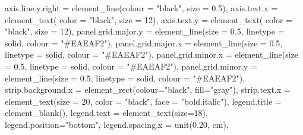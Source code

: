 \documentclass[
]{book}
\newenvironment{Shaded}{\begin{snugshade}}{\end{snugshade}}
\newcommand{\AttributeTok}[1]{\textcolor[rgb]{0.77,0.63,0.00}{#1}}
\newcommand{\DecValTok}[1]{\textcolor[rgb]{0.00,0.00,0.81}{#1}}
\newcommand{\FloatTok}[1]{\textcolor[rgb]{0.00,0.00,0.81}{#1}}
\newcommand{\FunctionTok}[1]{\textcolor[rgb]{0.00,0.00,0.00}{#1}}
\newcommand{\NormalTok}[1]{#1}
\newcommand{\StringTok}[1]{\textcolor[rgb]{0.31,0.60,0.02}{#1}}
\begin{document}
\begin{Shaded}
\begin{Highlighting}[]
  \AttributeTok{axis.line.y.right  =} \FunctionTok{element\_line}\NormalTok{(}\AttributeTok{colour =} \StringTok{"black"}\NormalTok{, }\AttributeTok{size =} \FloatTok{0.5}\NormalTok{),}
  \AttributeTok{axis.text.x        =} \FunctionTok{element\_text}\NormalTok{( }\AttributeTok{color =} \StringTok{"black"}\NormalTok{, }\AttributeTok{size =} \DecValTok{12}\NormalTok{),}
  \AttributeTok{axis.text.y        =} \FunctionTok{element\_text}\NormalTok{( }\AttributeTok{color =} \StringTok{"black"}\NormalTok{, }\AttributeTok{size =} \DecValTok{12}\NormalTok{),}
  \AttributeTok{panel.grid.major.y =} \FunctionTok{element\_line}\NormalTok{(}\AttributeTok{size =} \FloatTok{0.5}\NormalTok{,}
                                    \AttributeTok{linetype =} \StringTok{\textquotesingle{}solid\textquotesingle{}}\NormalTok{, }\AttributeTok{colour =} \StringTok{"\#EAEAF2"}\NormalTok{),}
  \AttributeTok{panel.grid.major.x =} \FunctionTok{element\_line}\NormalTok{(}\AttributeTok{size =} \FloatTok{0.5}\NormalTok{,}
                                    \AttributeTok{linetype =} \StringTok{\textquotesingle{}solid\textquotesingle{}}\NormalTok{, }\AttributeTok{colour =} \StringTok{"\#EAEAF2"}\NormalTok{),}
  \AttributeTok{panel.grid.minor.x =} \FunctionTok{element\_line}\NormalTok{(}\AttributeTok{size =} \FloatTok{0.5}\NormalTok{,}
                                    \AttributeTok{linetype =} \StringTok{\textquotesingle{}solid\textquotesingle{}}\NormalTok{, }\AttributeTok{colour =} \StringTok{"\#EAEAF2"}\NormalTok{),}
  \AttributeTok{panel.grid.minor.y =} \FunctionTok{element\_line}\NormalTok{(}\AttributeTok{size =} \FloatTok{0.5}\NormalTok{,}
                                    \AttributeTok{linetype =} \StringTok{\textquotesingle{}solid\textquotesingle{}}\NormalTok{, }\AttributeTok{colour =} \StringTok{"\#EAEAF2"}\NormalTok{),}
  \AttributeTok{strip.background.x =} \FunctionTok{element\_rect}\NormalTok{(}\AttributeTok{colour=}\StringTok{"black"}\NormalTok{, }\AttributeTok{fill=}\StringTok{"gray"}\NormalTok{),}
  \AttributeTok{strip.text.x       =} \FunctionTok{element\_text}\NormalTok{(}\AttributeTok{size =} \DecValTok{20}\NormalTok{, }\AttributeTok{color =} \StringTok{"black"}\NormalTok{, }\AttributeTok{face =} \StringTok{"bold.italic"}\NormalTok{),}
  \AttributeTok{legend.title =} \FunctionTok{element\_blank}\NormalTok{(),}
  \AttributeTok{legend.text  =} \FunctionTok{element\_text}\NormalTok{(}\AttributeTok{size=}\DecValTok{18}\NormalTok{),}
  \AttributeTok{legend.position=}\StringTok{"bottom"}\NormalTok{,}
  \AttributeTok{legend.spacing.x =} \FunctionTok{unit}\NormalTok{(}\FloatTok{0.20}\NormalTok{, }\StringTok{\textquotesingle{}cm\textquotesingle{}}\NormalTok{),}

\end{Highlighting}
\end{Shaded}
\end{document}
